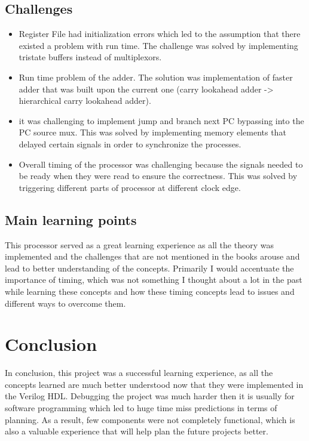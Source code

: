 \documentclass{article}
\begin{document}
\subsection{Challenges}
\begin{itemize}
    \item Register File had initialization errors which led to the assumption that there existed a problem with run time. The challenge was solved by implementing tristate buffers instead of multiplexors.
    \item Run time problem of the adder. The solution was implementation of faster adder that was built upon the current one (carry lookahead adder -> hierarchical carry lookahead adder).
    \item it was challenging to implement jump and branch next PC bypassing into the PC source mux. This was solved by implementing memory elements that delayed certain signals in order to synchronize the processes.
    \item Overall timing of the processor was challenging because the signals needed to be ready when they were read to ensure the correctness. This was solved by triggering different parts of processor at different clock edge.
\end{itemize}
\subsection{Main learning points}
This processor served as a great learning experience as all the theory was implemented and the challenges that are not mentioned in the books arouse and lead to better understanding of the concepts. Primarily I would accentuate the importance of timing, which was not something I thought about a lot in the past while learning these concepts and how these timing concepts lead to issues and different ways to overcome them.

\section{Conclusion}
In conclusion, this project was a successful learning experience, as all the concepts learned are much better understood now that they were implemented in the Verilog HDL. Debugging the project was much harder then it is usually for software programming which led to huge time miss predictions in terms of planning. As a result, few components were not completely functional, which is also a valuable experience that will help plan the future projects better. 
\end{document}
